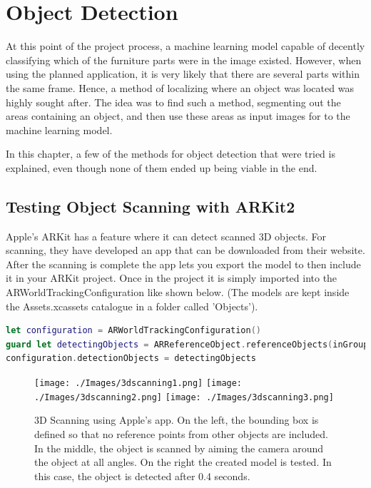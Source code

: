 \chapter{Object Detection}
At this point of the project process, a machine learning model capable of decently 
classifying which of the furniture parts were in the image existed. However, when using the 
planned application, it is very likely that there are several parts within the same frame. 
Hence, a method of localizing where an object was located was highly sought after. The idea 
was to find such a method, segmenting out the areas containing an object, and then use these  
areas as input images for to the machine learning model.

In this chapter, a few of the methods for object detection that were tried is explained, even though none of them ended up being viable in the end.
  
\section{Testing Object Scanning with ARKit2}
\label{sec:ODscanning}
Apple's ARKit has a feature where it can detect scanned 3D objects. For scanning, they have developed an app that can be downloaded from their website. \cite{ARScanning}
After the scanning is complete the app lets you export the model to then include it in your ARKit project. Once in the project it is simply imported into the ARWorldTrackingConfiguration like shown below. (The models are kept inside the Assets.xcassets catalogue in a folder called 'Objects').

\begin{lstlisting}[language=swift]
let configuration = ARWorldTrackingConfiguration()
guard let detectingObjects = ARReferenceObject.referenceObjects(inGroupNamed: "Objects", bundle: nil) else { return }
configuration.detectionObjects = detectingObjects
\end{lstlisting}

\begin{figure}[hbtp]
\begin{center}
\texttt{[image: ./Images/3dscanning1.png]}
\texttt{[image: ./Images/3dscanning2.png]}
\texttt{[image: ./Images/3dscanning3.png]} 
\caption{3D Scanning using Apple's app. On the left, the bounding box is defined so that no reference points from other objects are included. In the middle, the object is scanned by aiming the camera around the object at all angles. On the right the created model is tested. In this case, the object is detected after 0.4 seconds.}
\end{center}
\end{figure}

